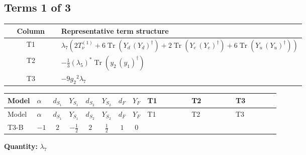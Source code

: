\documentclass[8pt]{article}
\begin{document}
\begin{landscape}
\subsection*{Terms 1 of 3}
\begin{center}
\begin{tabular}{@{}c >{\raggedright\arraybackslash}p{0.82\linewidth}@{}}
\toprule
Column & Representative term structure \\
\midrule
T1 & \(\displaystyle {\lambda_{7}} (2 T_{\nu}^{(1)}+6 \operatorname{Tr}\!\left({Y_d}\,\left({Y_d}\right)^{\dagger}\right)+2 \operatorname{Tr}\!\left({Y_e}\,\left({Y_e}\right)^{\dagger}\right)+6 \operatorname{Tr}\!\left({Y_u}\,\left({Y_u}\right)^{\dagger}\right))\) \\
\midrule
T2 & \(\displaystyle -\frac{1}{3} \left({\lambda_5}\right)^{*} \operatorname{Tr}\!\left({y_2}\,\left({y_1}\right)^{\dagger}\right)\) \\
\midrule
T3 & \(\displaystyle -9 {g_2}^2 {\lambda_{7}}\) \\
\midrule
\bottomrule
\end{tabular}
\end{center}
\smallskip
\tiny
\begin{longtable}{@{}llcccccc >{\raggedright\arraybackslash}p{0.21\linewidth} >{\raggedright\arraybackslash}p{0.21\linewidth} >{\raggedright\arraybackslash}p{0.21\linewidth}@{}}
\toprule
Model & $\alpha$ & $d_{S_1}$ & $Y_{S_1}$ & $d_{S_2}$ & $Y_{S_2}$ & $d_F$ & $Y_F$ & T1 & T2 & T3 \\
\midrule
\endfirsthead
\toprule
Model & $\alpha$ & $d_{S_1}$ & $Y_{S_1}$ & $d_{S_2}$ & $Y_{S_2}$ & $d_F$ & $Y_F$ & T1 & T2 & T3 \\
\midrule
\endhead
T3-B & $-1$ & $2$ & $-\frac{1}{2}$ & $2$ & $\frac{1}{2}$ & $1$ & $0$ & \scriptsize\adjustbox{max width=\linewidth}{$\begin{gathered} {\lambda_{7}} (2 T_{\nu}^{(1)}+6 \operatorname{Tr}\!\left({Y_d}\,\left({Y_d}\right)^{\dagger}\right)+2 \operatorname{Tr}\!\left({Y_e}\,\left({Y_e}\right)^{\dagger}\right)+6 \operatorname{Tr}\!\left({Y_u}\,\left({Y_u}\right)^{\dagger}\right))\end{gathered}$} & \scriptsize\adjustbox{max width=\linewidth}{$\begin{gathered} -\frac{1}{3} \left({\lambda_5}\right)^{*} \operatorname{Tr}\!\left({y_2}\,\left({y_1}\right)^{\dagger}\right)\end{gathered}$} & \scriptsize\adjustbox{max width=\linewidth}{$\begin{gathered} -9 {g_2}^2 {\lambda_{7}}\end{gathered}$} \\
\midrule
\bottomrule
\end{longtable}
\clearpage
\noindent\textbf{Quantity: }$\lambda_{7}$\par\smallskip

\end{landscape}
\end{document}

